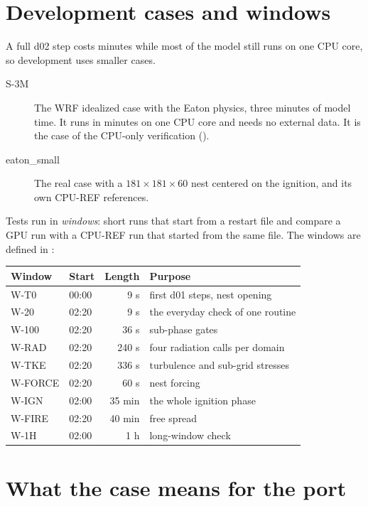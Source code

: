 \section{Development cases and windows}

A full d02 step costs minutes while most of the model still runs on one CPU core, so development uses smaller cases.
\begin{description}
  \item[S-3M] The WRF  idealized case with the Eaton physics, three minutes of model time. It runs in
    minutes on one CPU core and needs no external data. It is the case of the CPU-only verification
    ().
  \item[eaton\_small] The real case with a $181\times181\times60$ nest centered on the ignition, and its own CPU-REF
    references.
\end{description}

Tests run in \emph{windows}: short runs that start from a restart file and compare a GPU run with a CPU-REF run that
started from the same file. The windows are defined in :
\begin{center}
\begin{tabular}{llrl}
\toprule
Window & Start & Length & Purpose \\
\midrule
W-T0 & 00:00 & 9 s & first d01 steps, nest opening \\
W-20 & 02:20 & 9 s & the everyday check of one routine \\
W-100 & 02:20 & 36 s & sub-phase gates \\
W-RAD & 02:20 & 240 s & four radiation calls per domain \\
W-TKE & 02:20 & 336 s & turbulence and sub-grid stresses \\
W-FORCE & 02:20 & 60 s & nest forcing \\
W-IGN & 02:00 & 35 min & the whole ignition phase \\
W-FIRE & 02:20 & 40 min & free spread \\
W-1H & 02:00 & 1 h & long-window check \\
\bottomrule
\end{tabular}
\end{center}

\section{What the case means for the port}

